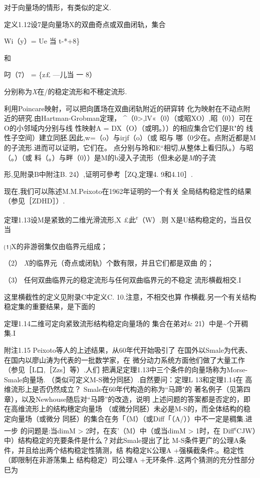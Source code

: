 \documentclass{article}
\begin{document}
对于向量场的情形，有类似的定义.

定义1.12设7是向量场X的双曲奇点或双曲闭轨，集合

Wi（y）= Ue 当 t-*+8\}

和

叼（7） = \{z£ ---儿当 一 8）

分别称为\emph{X}在/的稳定流形和不穂定流形.

利用Poincare映射，可以把向匱场在双曲闭轨附近的研穽转
化为映射在不动点附近的研究.由Hartman-Grobman定理，
\^{}（0\textgreater{},lV«（0）（或昭XO）,昭（0））可在O的小邻域内分别与线
性映射A = DX（O）（或明。））的相应集合它们是R"的
线性子空间）建立同胚.因此,w=（o）与irjf（o）（或 昭与
哪（0少在。点附近都是M的子流形.进而可以证明，它们在。
点分别与玲和E``相切,从整体上看归队。）与昭（。）（或
料（。）与畔（0））是M的b浸入子流形（但未必是\emph{M}的子流

形,见附录B中附注B. 24）,证明可參考［ZQ,定理4. 9和4.10］.

现在,我们可以陈述M.M.Peixoto在1962年证明的一个有关
全局结构稳定性的结果（参见［ZDHD］）.

定理1.13设M是紧致的二维光滑流形,X £此\textsuperscript{r}（W）.则
X是U结构稳定的，当且仅当

⑴X的非游弱集仅由临界元组成；

（2） \emph{X}的临界元（奇点或闭轨）个数有限，并且它们都是双曲 的；

（3） 任何双曲临界元的稳定流形与任何双曲临界元的不稳定 流形横截相交.I

这里横截性的定义见附录C中定义C. 10.注意，不相交也算
作横截.另一个有关结构稳定集的重要结果，是下面的

定理1.14二维可定向紧致流形结构稳定向量场的 集合在弟对\&
21）中是\textasciitilde{}个开稠集.I

附注1.15 Peixoto等人的上述结果，从60年代开始吸引了
在国外以Smale为代表、在国内以廖山涛为代表的一批数学家，在
微分动力系统方面他们做了大量工作（参见［L口,［Zzs］等）.人们
把满足定理1.13中三个条件的向量场称为Morse-Smale向量场.
（类似可定义M-S微分同胚）.自然要问：定理L 13和定理1.14在
高维流形上是否仍然成立？ Smale在60年代构造的称为``马蹄"的
著名例子（见第四章），以及Newhouse随后对``马蹄''的改造，说明
上述问题的答案都是否定的，即在高维流形上的结构穗定向量场
（或微分同胚）未必是M-S的，而全体结构的稳定向量场（或微分
同胚）的集合在务「（M）（或Diff「（A/））中不一定是稠集.进一步
的问题是:当dimM \textgreater{} 2时，在亥'（M）中（或当dimM
\textgreater{} 1时，在
Diff\textsuperscript{r}CJW）中）结构稳定的充要条件是什么？对此Smale提出了比
M-S条件更广的公理A条件，并且给出两个结构稳定性猜测，结 构稳定K公理A
+强橫截条件;。稳定性（即限制在非游荡集上 结构稳定）司公理A
+无环条件..这两个猜测的充分性部分巳为
\end{document}
